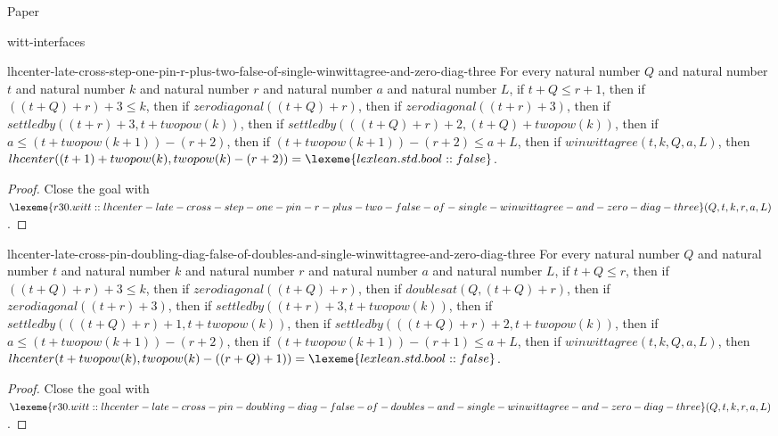 \begin{lexlean}{Paper}
\begin{section}{witt-interfaces}
  \begin{theorem}{lhcenter-late-cross-step-one-pin-r-plus-two-false-of-single-winwittagree-and-zero-diag-three}
  For every natural number \(Q\) and natural number \(t\) and natural number \(k\) and natural number \(r\) and natural number \(a\) and natural number \(L\), if \(t + Q ≤ r + 1\), then if \(((t + Q) + r) + 3 ≤ k\), then if \(zerodiagonal((t + Q) + r)\), then if \(zerodiagonal((t + r) + 3)\), then if \(settledby((t + r) + 3, t + twopow(k))\), then if \(settledby(((t + Q) + r) + 2, (t + Q) + twopow(k))\), then if \(a ≤ (t + twopow(k + 1)) - (r + 2)\), then if \((t + twopow(k + 1)) - (r + 2) ≤ a + L\), then if \(winwittagree(t, k, Q, a, L)\), then \(lhcenter((t + 1) + twopow(k), twopow(k) - (r + 2)) = \lexeme{lexlean.std.bool::false}\).
  \begin{proof}
  Close the goal with \(\lexeme{r30.witt::lhcenter-late-cross-step-one-pin-r-plus-two-false-of-single-winwittagree-and-zero-diag-three}(Q, t, k, r, a, L)\).
  \end{proof}
  \end{theorem}

  \begin{theorem}{lhcenter-late-cross-pin-doubling-diag-false-of-doubles-and-single-winwittagree-and-zero-diag-three}
  For every natural number \(Q\) and natural number \(t\) and natural number \(k\) and natural number \(r\) and natural number \(a\) and natural number \(L\), if \(t + Q ≤ r\), then if \(((t + Q) + r) + 3 ≤ k\), then if \(zerodiagonal((t + Q) + r)\), then if \(doublesat(Q, (t + Q) + r)\), then if \(zerodiagonal((t + r) + 3)\), then if \(settledby((t + r) + 3, t + twopow(k))\), then if \(settledby(((t + Q) + r) + 1, t + twopow(k))\), then if \(settledby(((t + Q) + r) + 2, t + twopow(k))\), then if \(a ≤ (t + twopow(k + 1)) - (r + 2)\), then if \((t + twopow(k + 1)) - (r + 1) ≤ a + L\), then if \(winwittagree(t, k, Q, a, L)\), then \(lhcenter(t + twopow(k), twopow(k) - ((r + Q) + 1)) = \lexeme{lexlean.std.bool::false}\).
  \begin{proof}
  Close the goal with \(\lexeme{r30.witt::lhcenter-late-cross-pin-doubling-diag-false-of-doubles-and-single-winwittagree-and-zero-diag-three}(Q, t, k, r, a, L)\).
  \end{proof}
  \end{theorem}


\end{section}
\end{lexlean}
